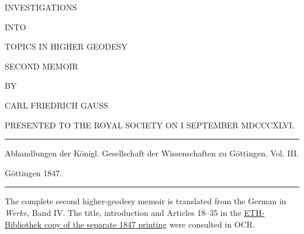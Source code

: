 \clearpage
{}
\thispagestyle{empty}
\vspace*{.3in}
\begin{center}
{\large INVESTIGATIONS}\par\bigskip
INTO\par\bigskip
{\Large TOPICS IN HIGHER GEODESY}\par\vspace{25pt}
SECOND MEMOIR\par\vspace{35pt}
BY\par\vspace{35pt}
{\large CARL FRIEDRICH GAUSS}\par\vspace{35pt}
{\small PRESENTED TO THE ROYAL SOCIETY ON I SEPTEMBER MDCCCXLVI.}
\end{center}
\vfill
\begin{center}
\rule{.8\linewidth}{.3pt}\par\smallskip
Abhandlungen der Königl. Gesellschaft der Wissenschaften zu Göttingen. Vol. III.\par
Göttingen 1847.\par\smallskip
\rule{.8\linewidth}{.3pt}
\end{center}
\par\bigskip\begingroup\fontsize{9}{11}\selectfont\raggedright\noindent The complete second higher-geodesy memoir is translated from the German in \textit{Werke}, Band IV. The title, introduction and Articles 18--35 in the \href{https://doi.org/10.3931/e-rara-2861}{ETH-Bibliothek copy of the separate 1847 printing} were consulted in OCR.\par\endgroup
\clearpage

